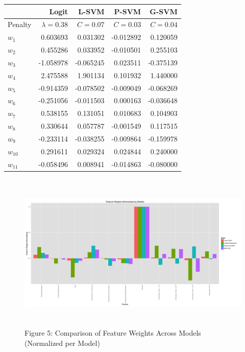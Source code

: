 \documentclass[10pt]{article}
\begin{document}
\begin{table}[ht]
\centering
{}
\begin{tabular}{lrrrr}
\toprule
{} & Logit & L-SVM & P-SVM & G-SVM \\
\midrule
Penalty & $\lambda = 0.38$ & $C = 0.07$ & $C = 0.03$ & $C = 0.04$\\
\midrule
$w_1$  &  0.603693 &  0.031302 & -0.012892 &  0.120059 \\
$w_2$  &  0.455286 &  0.033952 & -0.010501 &  0.255103 \\
$w_3$  & -1.058978 & -0.065245 &  0.023511 & -0.375139 \\
$w_4$  &  2.475588 &  1.901134 &  0.101932 &  1.440000 \\
$w_5$  & -0.914359 & -0.078502 & -0.009049 & -0.068269 \\
$w_6$  & -0.251056 & -0.011503 &  0.000163 & -0.036648 \\
$w_7$  &  0.538155 &  0.131051 &  0.010683 &  0.104903 \\
$w_8$  &  0.330644 &  0.057787 & -0.001549 &  0.117515 \\
$w_9$  & -0.233114 & -0.038255 & -0.009864 & -0.159978 \\
$w_{10}$ &  0.291611 &  0.029324 &  0.024844 &  0.240000 \\
$w_{11}$ & -0.058496 &  0.008941 & -0.014863 & -0.080000 \\
\bottomrule
\end{tabular}	
\end{table}

\begin{figure}[ht]
	\centering
	\includegraphics[height=3in]{titanic_weight_comparison.png}
	\caption*{Figure 5: Comparison of Feature Weights Across Models (Normalized per Model)}
\end{figure}
\end{document}
